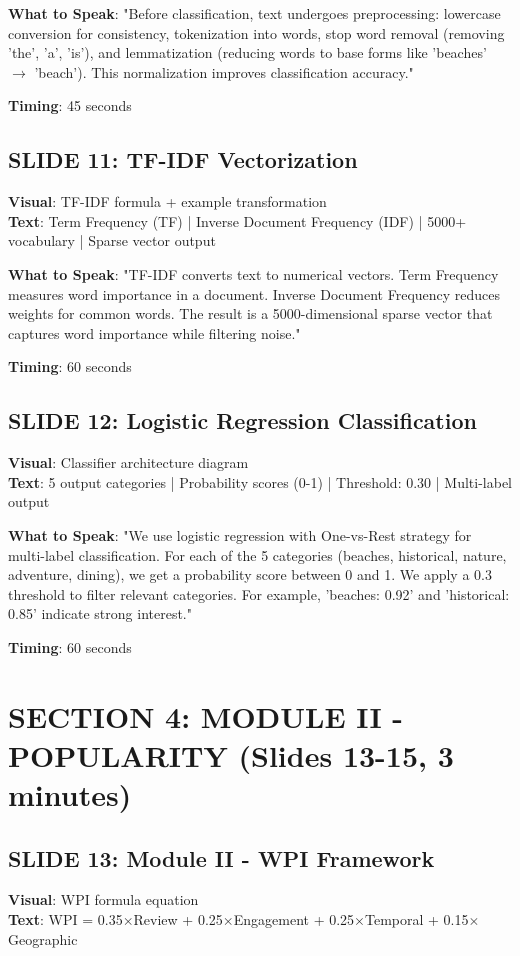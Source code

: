 \documentclass[12pt]{article}
\begin{document}
\textbf{What to Speak}:
"Before classification, text undergoes preprocessing: lowercase conversion for consistency, tokenization into words, stop word removal (removing 'the', 'a', 'is'), and lemmatization (reducing words to base forms like 'beaches' $\rightarrow$ 'beach'). This normalization improves classification accuracy."

\textbf{Timing}: 45 seconds

\subsection{SLIDE 11: TF-IDF Vectorization}
\textbf{Visual}: TF-IDF formula + example transformation \\
\textbf{Text}: Term Frequency (TF) | Inverse Document Frequency (IDF) | 5000+ vocabulary | Sparse vector output

\textbf{What to Speak}:
"TF-IDF converts text to numerical vectors. Term Frequency measures word importance in a document. Inverse Document Frequency reduces weights for common words. The result is a 5000-dimensional sparse vector that captures word importance while filtering noise."

\textbf{Timing}: 60 seconds

\subsection{SLIDE 12: Logistic Regression Classification}
\textbf{Visual}: Classifier architecture diagram \\
\textbf{Text}: 5 output categories | Probability scores (0-1) | Threshold: 0.30 | Multi-label output

\textbf{What to Speak}:
"We use logistic regression with One-vs-Rest strategy for multi-label classification. For each of the 5 categories (beaches, historical, nature, adventure, dining), we get a probability score between 0 and 1. We apply a 0.3 threshold to filter relevant categories. For example, 'beaches: 0.92' and 'historical: 0.85' indicate strong interest."

\textbf{Timing}: 60 seconds

\section{SECTION 4: MODULE II - POPULARITY (Slides 13-15, 3 minutes)}

\subsection{SLIDE 13: Module II - WPI Framework}
\textbf{Visual}: WPI formula equation \\
\textbf{Text}: WPI = 0.35$\times$Review + 0.25$\times$Engagement + 0.25$\times$Temporal + 0.15$\times$Geographic
\end{document}

